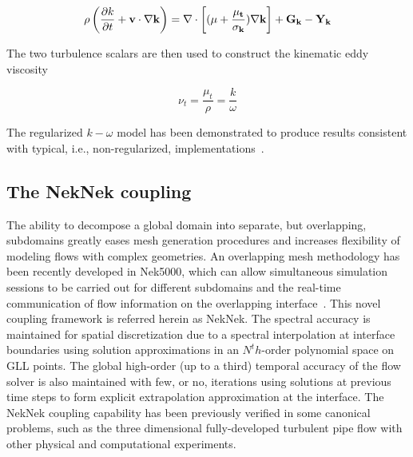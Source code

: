 \begin{equation}
\label{eqn:k_trans}
\rho \left( \frac{\partial k}{\partial t} + \bf{v} \cdot \bf{\nabla}  k \right) =  \bf{\nabla} \cdot \left[ (\mu+\frac{\mu_t}{\sigma_k } ) \bf{\nabla} k \right] + G_k - Y_k
\end{equation}

The two turbulence scalars are then used to construct the kinematic eddy viscosity

\begin{equation}
	\nu_t = \frac{\mu_t}{\rho} = \frac{k}{\omega}
\end{equation}

The regularized $k-\omega$ model has been demonstrated to produce results consistent with typical, i.e., non-regularized, implementations~\citep{Tomboulides2018}.


\subsection{The NekNek coupling}
\label{sec:nek3}

The ability to decompose a global domain into separate, but overlapping, subdomains greatly eases mesh generation procedures and increases flexibility of modeling flows with complex geometries.
An overlapping mesh methodology has been recently developed in Nek5000, which can allow simultaneous simulation sessions to be carried out for different subdomains and the real-time communication of flow information on the overlapping interface~\citep{Merrill2016}.
This novel coupling framework is referred herein as NekNek.
The spectral accuracy is maintained for spatial discretization due to a spectral interpolation at interface boundaries using solution approximations in an $N^th$-order polynomial space on GLL points.
The global high-order (up to a third) temporal accuracy of the flow solver is also maintained with few, or no, iterations using solutions at previous time steps to form explicit extrapolation approximation at the interface.
The NekNek coupling capability has been previously verified in some canonical problems, such as the three dimensional fully-developed turbulent pipe flow with other physical and computational experiments.

